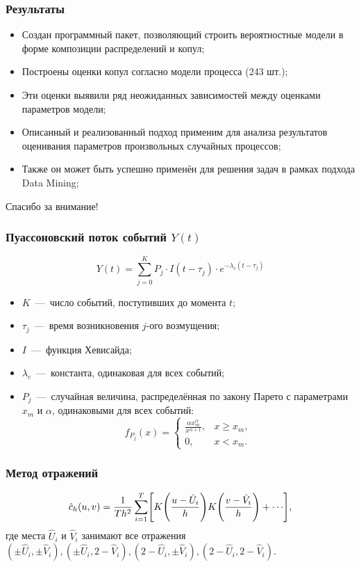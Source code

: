 \documentclass[11pt]{beamer}
\begin{document}
\begin{frame}
\begin{center}
\frametitle{Результаты}
\begin{itemize}
  \item Создан программный пакет, позволяющий строить вероятностные модели в форме композиции распределений и копул;
  \item Построены оценки копул согласно модели процесса (243 шт.);
  \item Эти оценки выявили ряд неожиданных зависимостей между оценками параметров модели;
  \item Описанный и реализованный подход применим для анализа результатов оценивания параметров произвольных случайных процессов;
  \item Также он может быть успешно применён для решения задач в рамках подхода Data Mining;
\end{itemize}
\end{center}
\end{frame}

\begin{frame}
\begin{center}
Спасибо за внимание!
\end{center}
\end{frame}

\begin{frame}
\frametitle{Пуассоновский поток событий $Y(t)$}
\[Y(t) = \sum_{j = 0}^K P_j \cdot I(t - \tau_j) \cdot e^{-\lambda_c(t - \tau_j)}\]
\begin{itemize}
  \item $K$~---~число событий, поступивших до момента $t$;
  \item $\tau_j$~---~время возникновения $j$-ого возмущения;
  \item $I$~---~функция Хевисайда;
  \item $\lambda_c$~---~константа, одинаковая для всех событий;
  \item $P_j$~---~случайная величина, распределённая по закону Парето с параметрами $x_m$ и $\alpha$, одинаковыми для всех событий:
\[
f_{P_j}(x) = \begin{cases}
\frac{\alpha x_m^\alpha}{x^{\alpha+1} }, &x \geqslant x_m,\\
0, &x < x_m.
\end{cases}
\]
\end{itemize}
\end{frame}

\begin{frame}
\frametitle{Метод отражений}
\[\hat{c}_h(u, v) = \frac{1}{Th^2}\sum_{i=1}^T\sqts*{K\brts*{\frac{u - \hat{U}_i}{h}}K\brts*{\frac{v - \hat{V}_i}{h}} + \cdots},\]
где места $\hat{U}_i$ и $\hat{V}_i$ занимают все отражения $(\pm\hat{U}_i, \pm\hat{V}_i), (\pm\hat{U}_i, 2 - \hat{V}_i), (2- \hat{U}_i, \pm\hat{V}_i), (2 - \hat{U}_i, 2- \hat{V}_i)$.
\end{frame}
\end{document}
